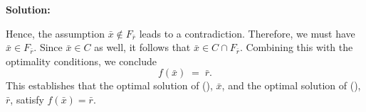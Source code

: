 \documentclass[12pt]{article}
\newenvironment{solution}
  {\par\noindent\textbf{Solution:}\par}
  {\par}
\begin{document}
\begin{enumerate}
\begin{enumerate}[label=\alph*]
\begin{solution}
          Hence, the assumption $\bar{x} \notin F_{\bar{r}}$ leads to a contradiction. Therefore, we must have $\bar{x} \in F_{\bar{r}}$. Since $\bar{x} \in C$ as well, it follows that $\bar{x} \in C \cap F_{\bar{r}}$. 
          Combining this with the optimality conditions, we conclude
          \[
          f(\bar{x}) \;=\; \bar{r}.
          \]
          This establishes that the optimal solution of (), $\bar{x}$, and the optimal solution of (), $\bar{r}$, satisfy $f(\bar{x}) = \bar{r}$.
          \end{solution}

  \end{enumerate}
\end{enumerate}
\end{document}
